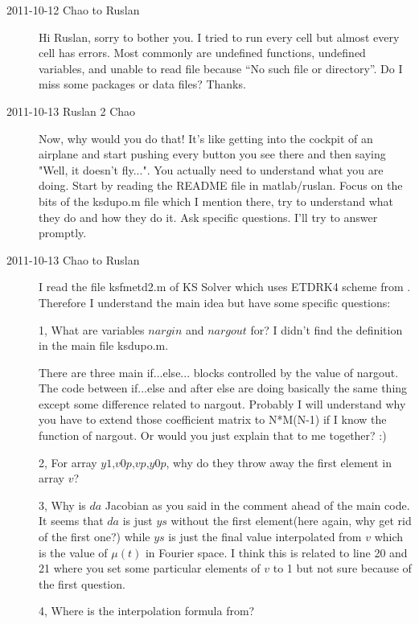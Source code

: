 \begin{description}

\item[2011-10-12 Chao to Ruslan]
Hi Ruslan, sorry to bother you. I tried to run every cell but almost every cell has errors. Most commonly are undefined functions, undefined variables, and unable to read file because ``No such file or directory''. Do I miss some packages or data files? Thanks.

\item[2011-10-13 Ruslan 2 Chao]  Now, why would you do that!  It's like getting into the cockpit of an airplane and start pushing every button you see there and then saying "Well, it doesn't fly...".  You actually need to understand what you are doing.  Start by reading the README file in matlab/ruslan.  Focus on the bits of the ksdupo.m file which I mention there, try to understand what they do and how they do it.  Ask specific questions.  I'll try to answer promptly.

\item[2011-10-13 Chao to Ruslan] I read the file ksfmetd2.m of KS Solver which uses ETDRK4 scheme from . Therefore I understand the main idea but have some specific questions:

1, What are variables $\textit{nargin}$ and $\textit{nargout}$ for? I didn't find the definition in the main file ksdupo.m.

   There are three main if...else... blocks controlled by the value of nargout. The code between if...else and after else are doing basically the same thing except some difference related to nargout. Probably I will understand why you have to extend those coefficient matrix to N*M(N-1) if I know the function of nargout. Or would you just explain that to me together? :)

2, For array $\textit{y1,v0p,vp,y0p}$, why do they throw away the first element in array $\textit{v}$?

3, Why is $\textit{da}$ Jacobian as you said in the comment ahead of the main code. It seems that $\textit{da}$ is just $\textit{ys}$ without the first element(here again, why get rid of the first one?) while $\textit{ys}$ is just the final value interpolated from $\textit{v}$ which is the value of $\mu(t)$ in Fourier space. I think this is related to line 20 and 21 where you set some particular elements of $\textit{v}$ to 1 but not sure because of the first question.

4, Where is the interpolation formula from?


\end{description}
